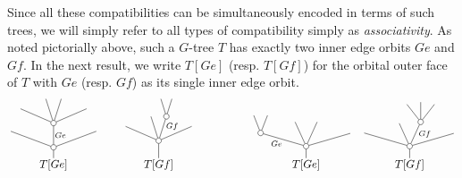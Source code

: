 \documentclass[a4paper,10pt
,draft
]{article}%
\begin{document}
Since all these compatibilities can be simultaneously encoded in terms of such trees, we will simply refer to all types of compatibility simply as \textit{associativity}.
As noted pictorially above, such a $G$-tree $T$
has exactly two inner edge orbits $Ge$ and $Gf$.
In the next result, we write $T[Ge]$ (resp. $T[Gf]$) for the orbital outer face of $T$ with $Ge$ (resp. $Gf$) as its single inner edge orbit. 
\[%
	\begin{tikzpicture}[auto,grow=up, every node/.style = {font=\scriptsize,inner sep=1pt},
	dummy/.style = {circle,draw,inner sep=0pt,minimum size=1.75mm}]%
	\begin{scope}[level distance = 1.6em]
	\tikzstyle{level 2}=[sibling distance=4em]%
	\tikzstyle{level 3}=[sibling distance=2em]%
	\tikzstyle{level 4}=[sibling distance=1em]%
		\node at (-1.675,0) [font=\normalsize]{$T[Ge]$}%
			child{node [dummy] {}%
				child[level distance = 1.5em]{node {}}%
				child[level distance = 2.2em]{node [dummy] {}%
					child[level distance = 1.3em]{}%
					child[level distance = 2.2em,sibling distance=1.4em]{
					}%
					child[level distance = 2.2em,sibling distance=1.4em]{}%
					child[level distance = 1.3em]{}%
				edge from parent node [swap]{$Ge$}}%
				child[level distance = 1.5em]{node {}}%
			};%
	\end{scope}
	\begin{scope}[level distance = 1.6em]
	\tikzstyle{level 2}=[sibling distance=2em]%
	\tikzstyle{level 3}=[sibling distance=1em]%
		\node at (1.675,0) [font=\normalsize]{$T[Gf]$}%
			child[level distance = 2.2em]{node [dummy] {}%
				child[level distance = 1.3em]{}%
				child[level distance = 2.2em,sibling distance=1.4em]{node [dummy] {}
					child[level distance = 1.6em]
					child[level distance = 1.6em]
				edge from parent node [swap,very near end] {$Gf$}}%
				child[level distance = 2.2em,sibling distance=1.4em]{}%
				child[level distance = 1.3em]{}%
			};%
	\end{scope}
	\begin{scope}[level distance = 1.7em]
	\tikzstyle{level 2}=[sibling distance=2.75em]%
	\tikzstyle{level 3}=[sibling distance=1.25em]%
		\node at (6.375,0) [font=\normalsize] {$T[Ge]$}%
			child{node [dummy] {}%
				child[level distance = 1.2em]{node {}}%
				child[sibling distance=2em,level distance = 2.2em]{
				}%
				child[sibling distance=2em,level distance = 2.2em]{}%
				child[level distance = 1.2em]{node [dummy] {}%
					child[level distance = 1.6em]{}%
					child[level distance = 1.6em]{}%
				edge from parent node {$Ge$}}%
			};%
		\node at (9.675,0) [font=\normalsize] {$T[Gf]$}%
			child{node [dummy] {}%
				child[level distance = 1.2em]{node {}}%
				child[sibling distance=2em,level distance = 2.2em]{node [dummy] {}%
					child[level distance = 1.6em]{}%
					child[level distance = 1.8em]{}%
					child[level distance = 1.6em]{}%
				edge from parent node [swap,near end] {$Gf$}}%
				child[sibling distance=2em,level distance = 2.2em]{node {}}%
				child[level distance = 1.2em]{
				}%
			};%
	\end{scope}
	\end{tikzpicture}%
\]%
\end{document}
